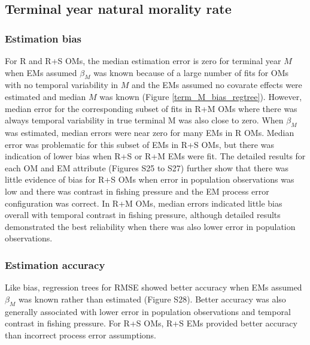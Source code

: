 \documentclass[
  12pt,
]{article}
\begin{document}
\subsection*{Terminal year natural morality
rate}\label{terminal-year-natural-morality-rate}

\subsubsection*{Estimation bias}\label{estimation-bias-2}

For R and R+S OMs, the median estimation error is zero for terminal year
\(M\) when EMs assumed \(\beta_M\) was known because of a large number
of fits for OMs with no temporal variability in \(M\) and the EMs
assumed no covarate effects were estimated and median \(M\) was known
(Figure \ref{term_M_bias_regtree}). However, median error for the
corresponding subset of fits in R+M OMs where there was always temporal
variability in true terminal M was also close to zero. When \(\beta_M\)
was estimated, median errors were near zero for many EMs in R OMs.
Median error was problematic for this subset of EMs in R+S OMs, but
there was indication of lower bias when R+S or R+M EMs were fit. The
detailed results for each OM and EM attribute (Figures S25 to S27)
further show that there was little evidence of bias for R+S OMs when
error in population observations was low and there was contrast in
fishing pressure and the EM process error configuration was correct. In
R+M OMs, median errors indicated little bias overall with temporal
contrast in fishing pressure, although detailed results demonstrated the
best reliability when there was also lower error in population
observations.

\subsubsection*{Estimation accuracy}\label{estimation-accuracy}

Like bias, regression trees for RMSE showed better accuracy when EMs
assumed \(\beta_M\) was known rather than estimated (Figure S28). Better
accuracy was also generally associated with lower error in population
observations and temporal contrast in fishing pressure. For R+S OMs, R+S
EMs provided better accuracy than incorrect process error assumptions.
\end{document}

